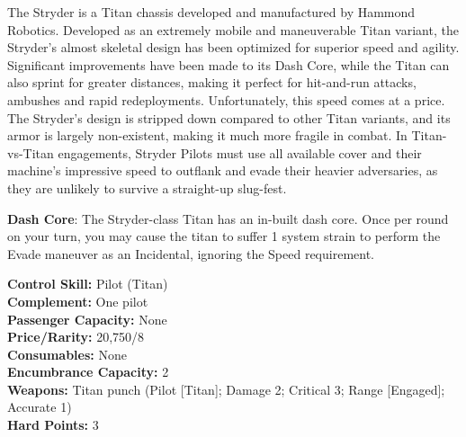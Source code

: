 \documentclass[9pt, openany]{extbook}
\begin{document}
The Stryder is a Titan chassis developed and manufactured by Hammond Robotics. Developed as an extremely mobile and maneuverable Titan variant, the Stryder's almost skeletal design has been optimized for superior speed and agility. Significant improvements have been made to its Dash Core, while the Titan can also sprint for greater distances, making it perfect for hit-and-run attacks, ambushes and rapid redeployments. Unfortunately, this speed comes at a price. The Stryder's design is stripped down compared to other Titan variants, and its armor is largely non-existent, making it much more fragile in combat. In Titan-vs-Titan engagements, Stryder Pilots must use all available cover and their machine's impressive speed to outflank and evade their heavier adversaries, as they are unlikely to survive a straight-up slug-fest.

\textbf{Dash Core}: The Stryder-class Titan has an in-built dash core. Once per round on your turn, you may cause the titan to suffer 1 system strain to perform the Evade maneuver as an Incidental, ignoring the Speed requirement.

\vspace{2em}


\begin{multicols}{2}
\noindent\textbf{Control Skill:} Pilot (Titan)\\
\noindent\textbf{Complement:} One pilot\\
\noindent\textbf{Passenger Capacity:} None\\
\noindent\textbf{Price/Rarity:} 20,750/8\\
\noindent\textbf{Consumables:} None\\
\noindent\textbf{Encumbrance Capacity:} 2\\
\noindent\textbf{Weapons:} Titan punch (Pilot [Titan]; Damage 2; Critical 3; Range [Engaged]; Accurate 1)\\
\noindent\textbf{Hard Points:} 3
\end{multicols}
\end{document}
